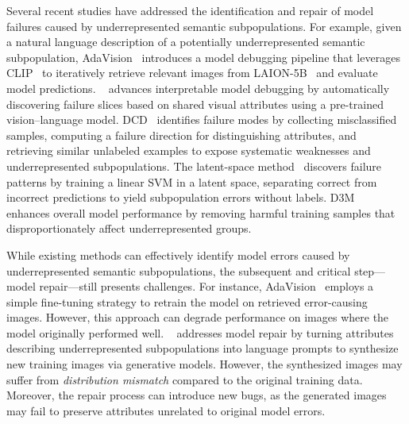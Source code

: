 Several recent studies have addressed the identification and repair of model failures caused by underrepresented semantic subpopulations. For example, given a natural language description of a potentially underrepresented semantic subpopulation, AdaVision~\cite{gao2023adaptive} introduces a model debugging pipeline that leverages CLIP~\cite{radford2021learning} to iteratively retrieve relevant images from LAION-5B~\cite{schuhmann2022laion} and evaluate model predictions. \hibug~\cite{chen2023hibug} advances interpretable model debugging by automatically discovering failure slices based on shared visual attributes using a pre-trained vision--language model. DCD~\cite{singla2024data} identifies failure modes by collecting misclassified samples, computing a failure direction for distinguishing attributes, and retrieving similar unlabeled examples to expose systematic weaknesses and underrepresented subpopulations.
The latent-space method~\cite{jain2023latentfailures} discovers failure patterns by training a linear SVM in a  latent space, separating correct from incorrect predictions to yield subpopulation errors without labels.
D3M~\cite{jain2023d3m} enhances overall model performance by removing harmful training samples that disproportionately affect underrepresented groups.

While existing methods can effectively identify model errors caused by underrepresented semantic subpopulations, the subsequent and critical step—model repair—still presents challenges. For instance, AdaVision~\cite{gao2023adaptive} employs a simple fine-tuning strategy to retrain the model on retrieved error-causing images.
However, this approach can degrade performance on images where the model originally performed well. \hibug~\cite{chen2023hibug} addresses model repair by turning attributes describing underrepresented subpopulations into language prompts to synthesize new training images via generative models. However, the synthesized images may suffer from \emph{distribution mismatch} compared to the original training data. Moreover, the repair process can introduce new bugs, as the generated images may fail to preserve attributes unrelated to original model errors.


